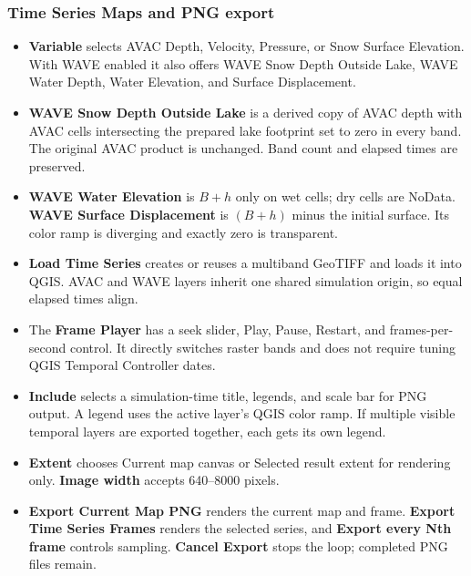 \documentclass[11pt,a4paper]{article}
\newcommand{\control}[1]{\textbf{#1}}
\begin{document}
\subsubsection{Time Series Maps and PNG export}

\begin{itemize}
  \item \control{Variable} selects AVAC Depth, Velocity, Pressure, or Snow
        Surface Elevation. With WAVE enabled it also offers WAVE Snow Depth
        Outside Lake, WAVE Water Depth, Water Elevation, and Surface
        Displacement.
  \item \control{WAVE Snow Depth Outside Lake} is a derived copy of AVAC depth
        with AVAC cells intersecting the prepared lake footprint set to zero
        in every band. The original AVAC product is unchanged. Band count and
        elapsed times are preserved.
  \item \control{WAVE Water Elevation} is $B+h$ only on wet cells; dry cells are
        NoData. \control{WAVE Surface Displacement} is $(B+h)$ minus the
        initial surface. Its color ramp is diverging and exactly zero is
        transparent.
  \item \control{Load Time Series} creates or reuses a multiband GeoTIFF and
        loads it into QGIS. AVAC and WAVE layers inherit one shared simulation
        origin, so equal elapsed times align.
  \item The \control{Frame Player} has a seek slider, Play, Pause, Restart, and
        frames-per-second control. It directly switches raster bands and does
        not require tuning QGIS Temporal Controller dates.
  \item \control{Include} selects a simulation-time title, legends, and scale
        bar for PNG output. A legend uses the active layer's QGIS color ramp.
        If multiple visible temporal layers are exported together, each gets
        its own legend.
  \item \control{Extent} chooses Current map canvas or Selected result extent
        for rendering only. \control{Image width} accepts 640--8000 pixels.
  \item \control{Export Current Map PNG} renders the current map and frame.
        \control{Export Time Series Frames} renders the selected series, and
        \control{Export every Nth frame} controls sampling. \control{Cancel
        Export} stops the loop; completed PNG files remain.
\end{itemize}
\end{document}
